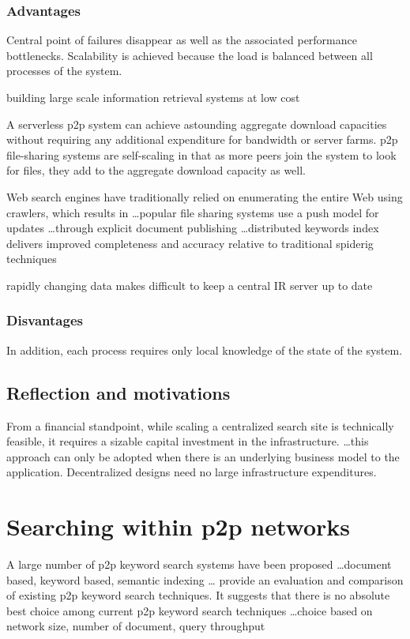 \subsubsection{Advantages}
Central point of failures disappear as well as the associated performance bottlenecks.
Scalability is achieved because the load is balanced between all processes of the system.

building large scale information retrieval systems at low cost

A serverless p2p system can achieve astounding aggregate download capacities without requiring any additional expenditure for bandwidth or server farms. p2p file-sharing systems are self-scaling in that as more peers join the system to look for files, they add to the aggregate download capacity as well.

Web search engines have traditionally relied on enumerating the entire Web using crawlers, which results in \ldots popular file sharing systems use a push model for updates \ldots through explicit document publishing \ldots distributed keywords index delivers improved completeness and accuracy relative to traditional spiderig techniques

rapidly changing data makes difficult to keep a central IR server up to date

\subsubsection{Disvantages}
In addition, each process requires only local knowledge of the state of the system.

\subsection{Reflection and motivations}
From a financial standpoint, while scaling a centralized search site is technically feasible, it requires a sizable capital investment in the infrastructure. \ldots this approach can only be adopted when there is an underlying business model to the application. Decentralized designs need no large infrastructure expenditures.



\section{Searching within p2p networks}
A large number of p2p keyword search systems have been proposed \ldots document based, keyword based, semantic indexing \ldots \cite{ZMS+05} provide an evaluation and comparison of existing p2p keyword search techniques. It suggests that there is no absolute best choice among current p2p keyword search techniques \ldots choice based on network size, number of document, query throughput 


